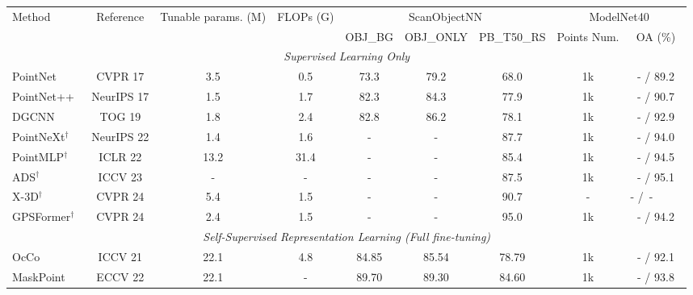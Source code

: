 \begin{table*}[ht]
\begin{tabular}{lcccccccc}
    \toprule
    \multirow{2.3}{*}{Method} &\multirow{2.3}{*}{Reference} &\multirow{2.3}{*}{Tunable params. (M)} &\multirow{2.3}{*}{FLOPs (G)} &\multicolumn{3}{c}{ScanObjectNN} &\multicolumn{2}{c}{ModelNet40}\\
		\cmidrule(r){5-7} \cmidrule{8-9}
	& & & &OBJ\_BG & OBJ\_ONLY &PB\_T50\_RS & Points Num. & OA (\%)  \\
    \midrule
    \multicolumn{9}{c}{\textit{Supervised Learning Only}} \\
    \midrule
    PointNet~\cite{qi2017pointnet} & CVPR 17 & 3.5 & 0.5  & 73.3  & 79.2  & 68.0 & 1k & - / 89.2 \\
    PointNet++~\cite{qi2017pointnet++}   & NeurIPS 17 & 1.5 & 1.7 & 82.3  & 84.3  & 77.9 & 1k & - / 90.7\\
    DGCNN~\cite{wang2019dynamic}  & TOG 19 & 1.8 & 2.4 & 82.8  & 86.2  & 78.1 & 1k & - / 92.9 \\
    PointNeXt$^{\dagger}$~\cite{qian2022pointnext} & NeurIPS 22  & 1.4 & 1.6 & -     & -  & 87.7 & 1k & - / 94.0\\
    PointMLP$^{\dagger}$~\cite{ma2022rethinking}  & ICLR 22 &  13.2 & 31.4  & -    & -     & 85.4  & 1k & - / 94.5\\
    ADS$^{\dagger}$~\cite{hong2023attention} & ICCV 23 & -  & -  &  - & -   & 87.5 & 1k  & - / 95.1 \\
    X-3D$^{\dagger}$~\cite{sun2024x} & CVPR 24 & 5.4 & 1.5 & - & - & 90.7 & - & - /~-~~~~~\\
    GPSFormer$^{\dagger}$~\cite{wang2024gpsformer} & CVPR 24 & 2.4 & 1.5 & - & - & 95.0 & 1k & - / 94.2\\
    \midrule
    \multicolumn{9}{c}{\textit{ Self-Supervised Representation Learning (Full fine-tuning)}} \\
    \midrule
    OcCo~\cite{wang2021unsupervised} & ICCV 21 & 22.1 & 4.8 & 84.85 & 85.54 & 78.79 & 1k & - / 92.1 \\
    MaskPoint~\cite{liu2022masked} & ECCV 22 & 22.1 & - & 89.70 & 89.30 &  84.60 & 1k & - / 93.8 \\

\end{tabular}
\end{table*}

